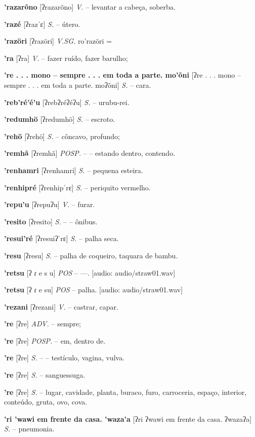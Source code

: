\textbf{'razarõno} [ʔrazarõno] \textit{V.} -- levantar a cabeça, soberba.

\textbf{'razé} [ʔrazˈɛ] \textit{S.} -- útero.

\textbf{'razöri} [ʔrazöri] \textit{V.SG.} ro'razöri =

\textbf{'ra} [ʔra] \textit{V.} -- fazer ruído, fazer barulho;

\textbf{'re . . . mono -- sempre . . . em toda a parte. mo'õni} [ʔre . . . mono -- sempre . . . em toda a parte. moʔõni] \textit{S.} -- cara.

\textbf{'reb'ré'é'u} [ʔrebʔréʔéʔu] \textit{S.} -- urubu-rei.

\textbf{'redumhö} [ʔredumhö] \textit{S.} -- escroto.

\textbf{'rehö} [ʔrehö] \textit{S.} -- côncavo, profundo;

\textbf{'remhã} [ʔremhã] \textit{POSP.} -- -- estando dentro, contendo.

\textbf{'renhamri} [ʔrenhamri] \textit{S.} -- pequena esteira.

\textbf{'renhipré} [ʔrenhipˈrɛ] \textit{S.} -- periquito vermelho.

\textbf{'repu'u} [ʔrepuʔu] \textit{V.} -- furar.

\textbf{'resito} [ʔresito] \textit{S.} -- -- ônibus.

\textbf{'resui'ré} [ʔresuiʔˈrɛ] \textit{S.} -- palha seca.

\textbf{'resu} [ʔresu] \textit{S.} -- palha de coqueiro, taquara de bambu.

\textbf{'retsu} [ʔ ɾ e s u] \textit{POS} -- —. [audio: audio/straw01.wav]{\faHeadphones}

\textbf{'retsu} [ʔ ɾ e su] \textit{POS} -- palha. [audio: audio/straw01.wav]{\faHeadphones}

\textbf{'rezani} [ʔrezani] \textit{V.} -- castrar, capar.

\textbf{'re} [ʔre] \textit{ADV.} -- sempre;

\textbf{'re} [ʔre] \textit{POSP.} -- em, dentro de.

\textbf{'re} [ʔre] \textit{S.} -- -- testículo, vagina, vulva.

\textbf{'re} [ʔre] \textit{S.} -- sanguessuga.

\textbf{'re} [ʔre] \textit{S.} -- lugar, cavidade, planta, buraco, furo, carroceria, espaço, interior, conteúdo, gruta, ovo, cova.

\textbf{'ri 'wawi em frente da casa. 'waza'a} [ʔri ʔwawi em frente da casa. ʔwazaʔa] \textit{S.} -- pneumonia.

